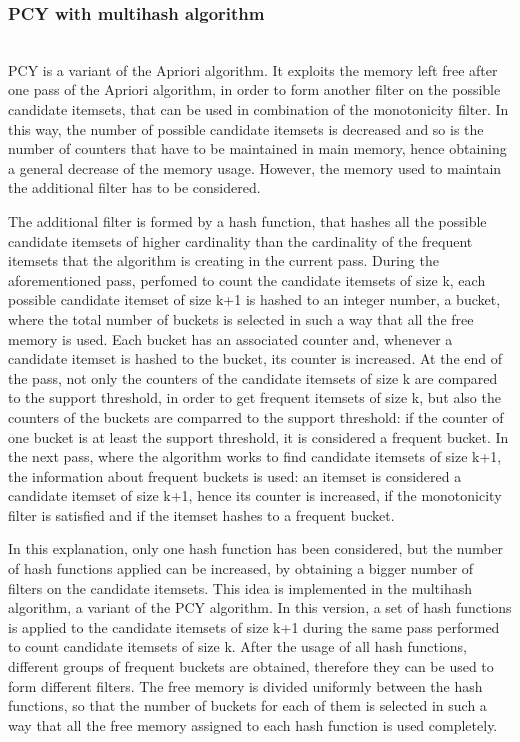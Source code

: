 \documentclass[conference,compsoc]{IEEEtran}
\theoremstyle{definition}
\begin{document}
\subsubsection{PCY with multihash algorithm} ~\\

PCY is a variant of the Apriori algorithm. It exploits the memory left free after one pass of the Apriori algorithm, in order to form another filter on the possible candidate itemsets, that can be used in combination of the monotonicity filter. In this way, the number of possible candidate itemsets is decreased and so is the number of counters that have to be maintained in main memory, hence obtaining a general decrease of the memory usage. However, the memory used to maintain the additional filter has to be considered.

The additional filter is formed by a hash function, that hashes all the possible candidate itemsets of higher cardinality than the cardinality of the frequent itemsets that the algorithm is creating in the current pass. During the aforementioned pass, perfomed to count the candidate itemsets of size k, each possible candidate itemset of size k+1 is hashed to an integer number, a bucket, where the total number of buckets is selected in such a way that all the free memory is used. Each bucket has an associated counter and, whenever a candidate itemset is hashed to the bucket, its counter is increased. At the end of the pass, not only the counters of the candidate itemsets of size k are compared to the support threshold, in order to get frequent itemsets of size k, but also the counters of the buckets are comparred to the support threshold: if the counter of one bucket is at least the support threshold, it is considered a frequent bucket. In the next pass, where the algorithm works to find candidate itemsets of size k+1, the information about frequent buckets is used: an itemset is considered a candidate itemset of size k+1, hence its counter is increased, if the monotonicity filter is satisfied and if the itemset hashes to a frequent bucket. 

In this explanation, only one hash function has been considered, but the number of hash functions applied can be increased, by obtaining a bigger number of filters on the candidate itemsets. This idea is implemented in the multihash algorithm, a variant of the PCY algorithm. In this version, a set of hash functions is applied to the candidate itemsets of size k+1 during the same pass performed to count candidate itemsets of size k. After the usage of all hash functions, different groups of frequent buckets are obtained, therefore they can be used to form different filters. The free memory is divided uniformly between the hash functions, so that the number of buckets for each of them is selected in such a way that all the free memory assigned to each hash function is used completely.
\end{document}

